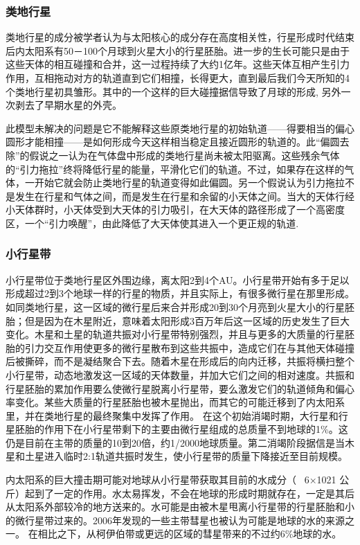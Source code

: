 \documentclass[hidelinks]{article}
\begin{document}
\subsubsection{类地行星}
类地行星的成分被学者认为与太阳核心的成分存在高度相关性，行星形成时代结束后内太阳系有50－100个月球到火星大小的行星胚胎。进一步的生长可能只是由于这些天体的相互碰撞和合并，这一过程持续了大约1亿年。这些天体互相产生引力作用，互相拖动对方的轨道直到它们相撞，长得更大，直到最后我们今天所知的4个类地行星初具雏形。其中的一个这样的巨大碰撞据信导致了月球的形成, 另外一次剥去了早期水星的外壳。

此模型未解决的问题是它不能解释这些原类地行星的初始轨道——得要相当的偏心圆形才能相撞——是如何形成今天这样相当稳定且接近圆形的轨道的。此“偏圆去除”的假说之一认为在气体盘中形成的类地行星尚未被太阳驱离。这些残余气体的“引力拖拉”终将降低行星的能量，平滑化它们的轨道。不过，如果存在这样的气体，一开始它就会防止类地行星的轨道变得如此偏圆。另一个假说认为引力拖拉不是发生在行星和气体之间，而是发生在行星和余留的小天体之间。当大的天体行经小天体群时，小天体受到大天体的引力吸引，在大天体的路径形成了一个高密度区，一个“引力唤醒”，由此降低了大天体使其进入一个更正规的轨道.
\subsubsection{小行星带}
小行星带位于类地行星区外围边缘，离太阳2到4个AU。小行星带开始有多于足以形成超过2到3个地球一样的行星的物质，并且实际上，有很多微行星在那里形成。如同类地行星，这一区域的微行星后来合并形成20到30个月亮到火星大小的行星胚胎；但是因为在木星附近，意味着太阳形成3百万年后这一区域的历史发生了巨大变化。木星和土星的轨道共振对小行星带特别强烈，并且与更多的大质量的行星胚胎的引力交互作用使更多的微行星散布到这些共振中，造成它们在与其他天体碰撞后被撕碎，而不是凝结聚合下去。随着木星在形成后的向内迁移，共振将横扫整个小行星带，动态地激发这一区域的天体数量，并加大它们之间的相对速度。共振和行星胚胎的累加作用要么使微行星脱离小行星带，要么激发它们的轨道倾角和偏心率变化。某些大质量的行星胚胎也被木星抛出，而其它的可能迁移到了内太阳系里，并在类地行星的最终聚集中发挥了作用。 在这个初始消竭时期，大行星和行星胚胎的作用下在小行星带剩下的主要由微行星组成的总质量不到地球的1\%。这仍是目前在主带的质量的10到20倍，约1/2000地球质量。第二消竭阶段据信是当木星和土星进入临时2:1轨道共振时发生，使小行星带的质量下降接近至目前规模。

内太阳系的巨大撞击期可能对地球从小行星带获取其目前的水成分（ ~6×1021 公斤）起到了一定的作用。水太易挥发，不会在地球的形成时期就存在，一定是其后从太阳系外部较冷的地方送来的。水可能是由被木星甩离小行星带的行星胚胎和小的微行星带过来的。2006年发现的一些主带彗星也被认为可能是地球的水的来源之一。 在相比之下，从柯伊伯带或更远的区域的彗星带来的不过约6\%地球的水。
\end{document}
